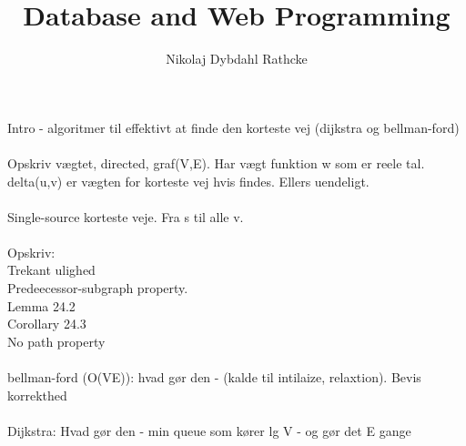 \documentclass[12pt]{article}
\title{Database and Web Programming}
\author{Nikolaj Dybdahl Rathcke}
\begin{document}
Intro - algoritmer til effektivt at finde den korteste vej (dijkstra og bellman-ford)\\
\\
Opskriv vægtet, directed, graf(V,E). Har vægt funktion w som er reele tal. delta(u,v) er vægten for korteste vej hvis findes. Ellers uendeligt.\\
\\
Single-source korteste veje. Fra s til alle v.\\
\\
Opskriv:\\
Trekant ulighed\\
Predeecessor-subgraph property.\\
Lemma 24.2\\
Corollary 24.3\\
No path property\\
\\
bellman-ford (O(VE)): hvad gør den - (kalde til intilaize, relaxtion). Bevis korrekthed\\
\\
Dijkstra: Hvad gør den - min queue som kører lg V - og gør det E gange\\
\end{document}
